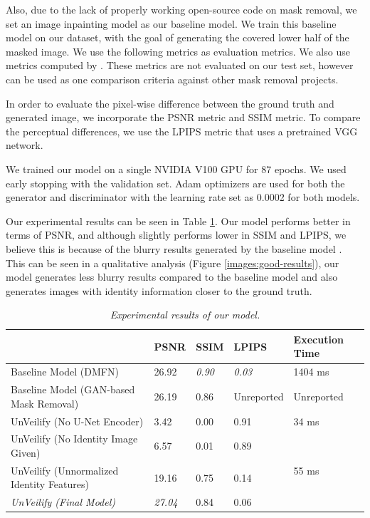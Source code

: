 \documentclass[sigconf,authorversion,nonacm]{acmart}
\begin{document}
Also, due to the lack of properly working open-source code on mask removal, we set an image
inpainting model \cite{DMFN} as our baseline model. We train this baseline model on our dataset,
with the goal of generating the covered lower half of the masked image.
We use the following metrics as evaluation metrics. We also use metrics computed by \cite{GAN-Mask-Removal}.
These metrics are not evaluated on our test set, however can be used as one comparison criteria against other mask removal projects.

In order to evaluate the pixel-wise
difference between the ground truth and generated image, we incorporate the PSNR metric and
SSIM metric.
To compare the perceptual differences, we use the LPIPS metric \cite{LPIPS} that uses
a pretrained VGG network.

We trained our model on a single NVIDIA V100 GPU for 87 epochs. We used early stopping with the
validation set. Adam optimizers are used for both the generator and discriminator
with the learning rate set as 0.0002 for both models.

Our experimental results can be seen in Table \ref{table:experiment-results}. Our model performs
better in terms of PSNR, and although slightly performs lower in SSIM and LPIPS, we believe this
is because of the blurry results generated by the baseline model \cite{BadSSIM1, BadSSIM2}. This
can be seen in a qualitative analysis (Figure \ref{images:good-results}), our model generates
less blurry results compared to the baseline model and also generates images with identity information closer to the ground truth.

\begin{table}[t]
\begin{tabular}{|l|l|l|l|l|}
\hline
 & PSNR & SSIM & LPIPS & Execution Time \\ \hline
Baseline Model (DMFN) \cite{DMFN} & 26.92 & \emph{0.90} & \emph{0.03} & 1404 ms  \\ \hline
Baseline Model (GAN-based Mask Removal) \cite{GAN-Mask-Removal} & 26.19 & 0.86 & Unreported & Unreported \\ \hline
UnVeilify (No U-Net Encoder) & 3.42 & 0.00 & 0.91 & 34 ms\\ \hline
UnVeilify (No Identity Image Given) & 6.57 & 0.01 & 0.89 & \multirow{3}{*}{55 ms} \\ \cline{1-4}
UnVeilify (Unnormalized Identity Features) & 19.16 & 0.75 & 0.14 & \\ \cline{1-4}
\emph{UnVeilify (Final Model)} & \emph{27.04} & 0.84 & 0.06 & \\ \hline
\end{tabular}
\caption{\emph{Experimental results of our model.}}
\label{table:experiment-results}
\end{table}
\end{document}
